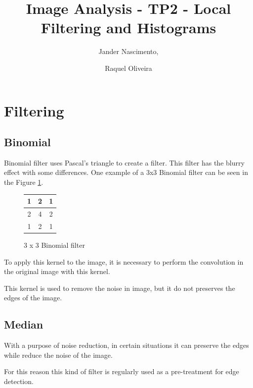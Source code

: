 \documentclass{article}
\begin{document}
\title{Image Analysis - TP2 - Local Filtering and Histograms}

\author{Jander Nascimento, 
\and Raquel Oliveira}

\maketitle

\section{Filtering}
	
	\subsection{Binomial}

		Binomial filter uses Pascal's triangle to create a filter. This filter has the blurry effect with some differences.
One example of a 3x3 Binomial filter can be seen in the Figure \ref{3x3binomial}.

\begin{figure}[H]
  \begin{center}
  \begin{tabular}{ | c | c | c | }
    \hline
    1 & 2 & 1 \\ \hline

    2 & 4 & 2 \\ \hline

    1 & 2 & 1 \\
    \hline
  \end{tabular}
  \end{center}
  \caption{3 x 3 Binomial filter\label{3x3binomial}}\end{figure}

		To apply this kernel to the image, it is necessary to perform the convolution in the original image with this kernel.

		This kernel is used to remove the noise in image, but it do not preserves the edges of the image. 
		
	\subsection{Median}

		With a purpose of noise reduction, in certain situations it can preserve the edges while reduce the noise of the image.

		For this reason this kind of filter is regularly used as a pre-treatment for edge detection.
\end{document}
